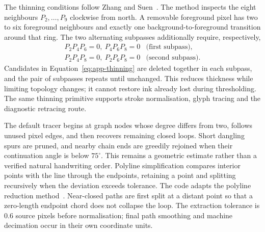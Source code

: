 The thinning conditions follow Zhang and Suen~\cite[p.~237]{zhang1984}. The method inspects the eight neighbours $P_2,\ldots,P_9$ clockwise from north. A removable foreground pixel has two to six foreground neighbours and exactly one background-to-foreground transition around that ring. The two alternating subpasses additionally require, respectively,
\begin{equation}
\begin{array}{ll}
P_2P_4P_6=0,\ P_4P_6P_8=0 &\text{(first subpass)},\\
P_2P_4P_8=0,\ P_2P_6P_8=0 &\text{(second subpass)}.
\end{array}
\label{eq:app-thinning}
\end{equation}
Candidates in Equation~\ref{eq:app-thinning} are deleted together in each subpass, and the pair of subpasses repeats until unchanged. This reduces thickness while limiting topology changes; it cannot restore ink already lost during thresholding. The same thinning primitive supports stroke normalisation, glyph tracing and the diagnostic retracing route.

The default tracer begins at graph nodes whose degree differs from two, follows unused pixel edges, and then recovers remaining closed loops. Short dangling spurs are pruned, and nearby chain ends are greedily rejoined when their continuation angle is below $75^\circ$. This remains a geometric estimate rather than a verified natural handwriting order. Polyline simplification compares interior points with the line through the endpoints, retaining a point and splitting recursively when the deviation exceeds tolerance. The code adapts the polyline reduction method~\cite{douglas1973}. Near-closed paths are first split at a distant point so that a zero-length endpoint chord does not collapse the loop. The extraction tolerance is 0.6 source pixels before normalisation; final path smoothing and machine decimation occur in their own coordinate units.

